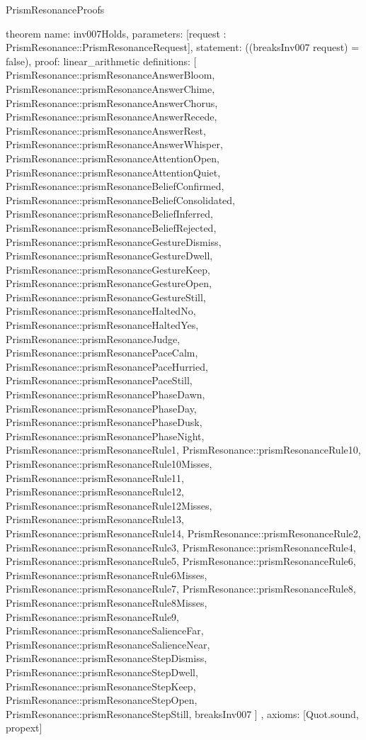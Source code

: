 \begin{lexlean}{PrismResonanceProofs}
\begin{semanticmodule}
theorem{
  name: inv007Holds,
  parameters: [request : PrismResonance::PrismResonanceRequest],
  statement: ((breaksInv007 request) = false),
  proof: linear_arithmetic{
    definitions: [
      PrismResonance::prismResonanceAnswerBloom,
      PrismResonance::prismResonanceAnswerChime,
      PrismResonance::prismResonanceAnswerChorus,
      PrismResonance::prismResonanceAnswerRecede,
      PrismResonance::prismResonanceAnswerRest,
      PrismResonance::prismResonanceAnswerWhisper,
      PrismResonance::prismResonanceAttentionOpen,
      PrismResonance::prismResonanceAttentionQuiet,
      PrismResonance::prismResonanceBeliefConfirmed,
      PrismResonance::prismResonanceBeliefConsolidated,
      PrismResonance::prismResonanceBeliefInferred,
      PrismResonance::prismResonanceBeliefRejected,
      PrismResonance::prismResonanceGestureDismiss,
      PrismResonance::prismResonanceGestureDwell,
      PrismResonance::prismResonanceGestureKeep,
      PrismResonance::prismResonanceGestureOpen,
      PrismResonance::prismResonanceGestureStill,
      PrismResonance::prismResonanceHaltedNo,
      PrismResonance::prismResonanceHaltedYes,
      PrismResonance::prismResonanceJudge,
      PrismResonance::prismResonancePaceCalm,
      PrismResonance::prismResonancePaceHurried,
      PrismResonance::prismResonancePaceStill,
      PrismResonance::prismResonancePhaseDawn,
      PrismResonance::prismResonancePhaseDay,
      PrismResonance::prismResonancePhaseDusk,
      PrismResonance::prismResonancePhaseNight,
      PrismResonance::prismResonanceRule1,
      PrismResonance::prismResonanceRule10,
      PrismResonance::prismResonanceRule10Misses,
      PrismResonance::prismResonanceRule11,
      PrismResonance::prismResonanceRule12,
      PrismResonance::prismResonanceRule12Misses,
      PrismResonance::prismResonanceRule13,
      PrismResonance::prismResonanceRule14,
      PrismResonance::prismResonanceRule2,
      PrismResonance::prismResonanceRule3,
      PrismResonance::prismResonanceRule4,
      PrismResonance::prismResonanceRule5,
      PrismResonance::prismResonanceRule6,
      PrismResonance::prismResonanceRule6Misses,
      PrismResonance::prismResonanceRule7,
      PrismResonance::prismResonanceRule8,
      PrismResonance::prismResonanceRule8Misses,
      PrismResonance::prismResonanceRule9,
      PrismResonance::prismResonanceSalienceFar,
      PrismResonance::prismResonanceSalienceNear,
      PrismResonance::prismResonanceStepDismiss,
      PrismResonance::prismResonanceStepDwell,
      PrismResonance::prismResonanceStepKeep,
      PrismResonance::prismResonanceStepOpen,
      PrismResonance::prismResonanceStepStill,
      breaksInv007
    ]
  },
  axioms: [Quot.sound, propext]
}


\end{semanticmodule}
\end{lexlean}
